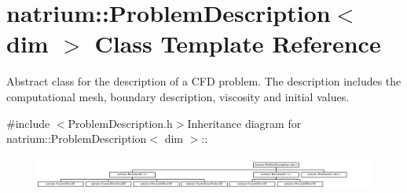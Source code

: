 \hypertarget{classnatrium_1_1ProblemDescription}{
\section{natrium::ProblemDescription$<$ dim $>$ Class Template Reference}
\label{classnatrium_1_1ProblemDescription}
}


Abstract class for the description of a CFD problem. The description includes the computational mesh, boundary description, viscosity and initial values.  


{\ttfamily \#include $<$ProblemDescription.h$>$}Inheritance diagram for natrium::ProblemDescription$<$ dim $>$::\begin{figure}[H]
\begin{center}
\leavevmode
\includegraphics[height=1.09091cm]{classnatrium_1_1ProblemDescription}
\end{center}
\end{figure}
